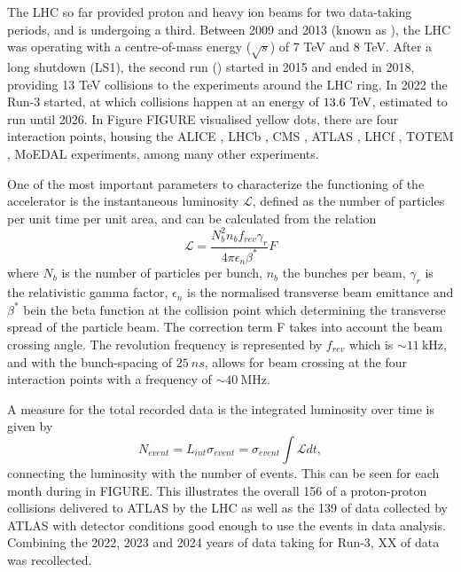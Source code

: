 The \ac{LHC} so far provided proton and heavy ion beams for two data-taking periods, and is undergoing a third. Between 2009 and 2013 (known as \RunOne), the \ac{LHC} was operating with a centre-of-mass energy ($\sqrt{s}$) of 7 TeV and 8 TeV.  After a long shutdown (LS1), the second run (\RunTwo) started in 2015 and ended in 2018, providing 13 TeV collisions to the experiments around the \ac{LHC} ring. In 2022 the Run-3 started, at which \pp collisions happen at an energy of \(13.6~\text{TeV}\), estimated to run until 2026.
In Figure FIGURE visualised yellow dots, there are four interaction points, housing the \acs{ALICE} \cite{ALICE},  \acs{LHCb} \cite{LHCb}, \acs{CMS} \cite{CMS},  \acs{ATLAS} \cite{AtlasExperiment}, \acs{LHCf} \cite{LHCf} , \acs{TOTEM} \cite{TOTEM}, \acs{MoEDAL} \cite{MoEDAL} experiments,  among many other experiments.


One of the most important parameters to characterize the functioning of the accelerator is the instantaneous luminosity \(\mathcal{L}\), defined as the number of particles per unit time per unit area, and can be calculated from the relation
\begin{equation}
    \mathcal{L} = \frac{N_b^ 2n_b f_{rev}\gamma_r}{4\pi\epsilon_n\beta^*}F
    \label{eq:atlas:LHC:instantaneous_lumi}
\end{equation}
where $N_b$ is the number of particles per bunch, $n_b$ the bunches per beam, $\gamma_r$ is the relativistic gamma factor, $\epsilon_n$ is the normalised transverse beam emittance and $\beta^*$ bein the beta function at the collision point which determining the transverse spread of the particle beam. The correction term F takes into account the beam crossing angle. The revolution frequency is represented by $f_{rev}$ which is \(\sim 11~\)kHz, and with the bunch-spacing of \(25~ns\), allows for beam crossing at the four interaction points with a frequency of \(\sim 40~\)MHz. 

A measure for the total recorded data is the integrated luminosity over time is given by
\begin{equation}
    N_{event} = L_{int} \sigma_{event} = \sigma_{event} \int \mathcal{L} dt,
    \label{eq:atlas:LHC:integrated_lumi}
\end{equation}
connecting the luminosity with the number of events. This can be seen for each month during \RunTwo in FIGURE.  This illustrates the overall 156 \ifb of a proton-proton collisions delivered to \ac{ATLAS} by the \ac{LHC} as well as the 139 \ifb of data collected by \ac{ATLAS} with detector conditions good enough to use the events in data analysis. Combining the 2022, 2023 and 2024 years of data taking for Run-3, XX \ifb of data was recollected.

